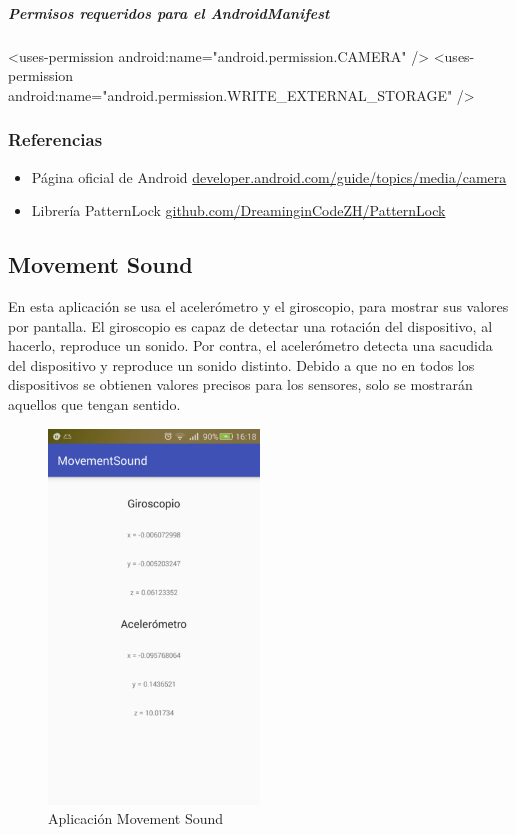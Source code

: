 \documentclass[	DIV=calc,%
							paper=a4,%
							fontsize=11pt]{scrartcl}	 					%
\begin{document}
\subparagraph{Permisos requeridos para el
AndroidManifest}\label{permisos-requeridos-para-el-androidmanifest-2}

\begin{xmlcode}
	<uses-permission android:name="android.permission.CAMERA" />
	<uses-permission android:name="android.permission.WRITE_EXTERNAL_STORAGE" />
\end{xmlcode}

\subsubsection{Referencias}\label{referencias-1}

\begin{itemize}
\itemsep1pt\parskip0pt
\item
  Página oficial de Android \textbar{}
  \href{http://developer.android.com/guide/topics/media/camera.html}{developer.android.com/guide/topics/media/camera}
\item
  Librería PatternLock \textbar{}
  \href{https://github.com/DreaminginCodeZH/PatternLock}{github.com/DreaminginCodeZH/PatternLock}
\end{itemize}

\subsection{Movement Sound}\label{movement-sound}

En esta aplicación se usa el acelerómetro y el giroscopio, para mostrar
sus valores por pantalla. El giroscopio es capaz de detectar una
rotación del dispositivo, al hacerlo, reproduce un sonido. Por contra,
el acelerómetro detecta una sacudida del dispositivo y reproduce un
sonido distinto. Debido a que no en todos los dispositivos se obtienen
valores precisos para los sensores, solo se mostrarán aquellos que
tengan sentido.

\begin{figure}[H]
\centering
\includegraphics[width=0.5\textwidth]{./img/movementSound.png}
\caption{Aplicación Movement Sound}
\end{figure}
\end{document}
